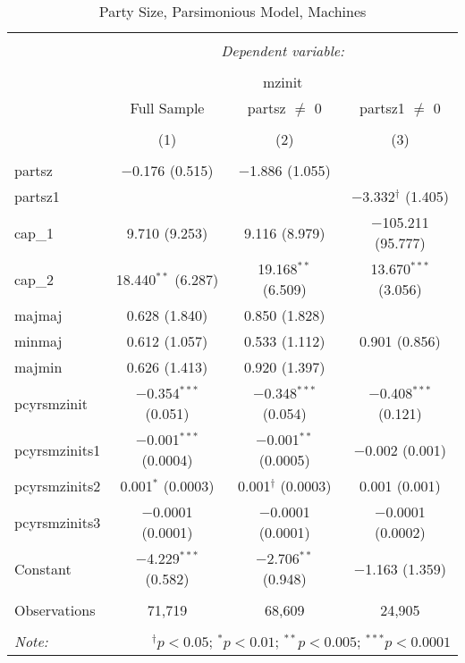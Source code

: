 
\begin{table}[!htbp] \centering 
  \caption{Party Size, Parsimonious Model, Machines} 
  \label{} 
\begin{tabular}{@{\extracolsep{5pt}}lccc} 
\\[-1.8ex]\hline 
\hline \\[-1.8ex] 
 & \multicolumn{3}{c}{\textit{Dependent variable:}} \\ 
\cline{2-4} 
\\[-1.8ex] & \multicolumn{3}{c}{mzinit} \\ 
 & Full Sample & partsz $\neq$ 0 & partsz1 $\neq$ 0 \\ 
\\[-1.8ex] & (1) & (2) & (3)\\ 
\hline \\[-1.8ex] 
 partsz & $-$0.176 (0.515) & $-$1.886 (1.055) &  \\ 
  partsz1 &  &  & $-$3.332$^{\dagger}$ (1.405) \\ 
  cap\_1 & 9.710 (9.253) & 9.116 (8.979) & $-$105.211 (95.777) \\ 
  cap\_2 & 18.440$^{**}$ (6.287) & 19.168$^{**}$ (6.509) & 13.670$^{***}$ (3.056) \\ 
  majmaj & 0.628 (1.840) & 0.850 (1.828) &  \\ 
  minmaj & 0.612 (1.057) & 0.533 (1.112) & 0.901 (0.856) \\ 
  majmin & 0.626 (1.413) & 0.920 (1.397) &  \\ 
  pcyrsmzinit & $-$0.354$^{***}$ (0.051) & $-$0.348$^{***}$ (0.054) & $-$0.408$^{***}$ (0.121) \\ 
  pcyrsmzinits1 & $-$0.001$^{***}$ (0.0004) & $-$0.001$^{**}$ (0.0005) & $-$0.002 (0.001) \\ 
  pcyrsmzinits2 & 0.001$^{*}$ (0.0003) & 0.001$^{\dagger}$ (0.0003) & 0.001 (0.001) \\ 
  pcyrsmzinits3 & $-$0.0001 (0.0001) & $-$0.0001 (0.0001) & $-$0.0001 (0.0002) \\ 
  Constant & $-$4.229$^{***}$ (0.582) & $-$2.706$^{**}$ (0.948) & $-$1.163 (1.359) \\ 
 \hline \\[-1.8ex] 
Observations & 71,719 & 68,609 & 24,905 \\ 
\hline 
\hline \\[-1.8ex] 
\textit{Note:}  & \multicolumn{3}{r}{$^{\dagger} p<0.05$; $^{*} p<0.01$; $^{**} p<0.005$; $^{***} p<0.0001$} \\ 
\end{tabular} 
\end{table} 
